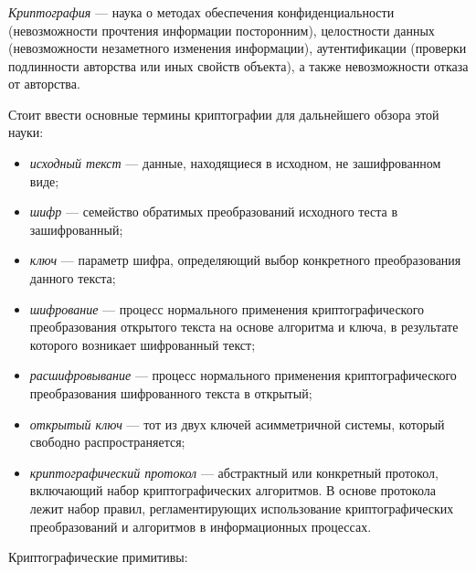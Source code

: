 \subsubsection{}
\label{sec:analysis:research:crypto:general}

\emph{Криптография} --- наука о методах обеспечения конфиденциальности (невозможности прочтения информации посторонним), целостности данных (невозможности незаметного изменения информации), аутентификации (проверки подлинности авторства или иных свойств объекта), а также невозможности отказа от авторства. \cite{wiki:crypto}

Стоит ввести основные термины криптографии для дальнейшего обзора этой науки:

\begin{itemize}
	\item \emph{исходный текст} --- данные, находящиеся в исходном, не зашифрованном виде;
	\item \emph{шифр} --- семейство обратимых преобразований исходного теста в зашифрованный;
	\item \emph{ключ} --- параметр шифра, определяющий выбор конкретного преобразования данного текста;
	\item \emph{шифрование} --- процесс нормального применения криптографического преобразования открытого текста на основе алгоритма и ключа, в результате которого возникает шифрованный текст;
	\item \emph{расшифровывание} --- процесс нормального применения криптографического преобразования шифрованного текста в открытый;
	\item \emph{открытый ключ} --- тот из двух ключей асимметричной системы, который свободно распространяется;
	\item \emph{криптографический протокол} --- абстрактный или конкретный протокол, включающий набор криптографических алгоритмов. В основе протокола лежит набор правил, регламентирующих использование криптографических преобразований и алгоритмов в информационных процессах.
\end{itemize}

Криптографические примитивы:

